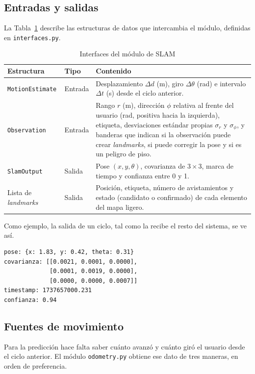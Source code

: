\subsection{Entradas y salidas}

La Tabla~\ref{tab:slam_interfaces} describe las estructuras de datos que intercambia el
módulo, definidas en \texttt{interfaces.py}.

\begin{table}[H]
\centering
\caption{Interfaces del módulo de SLAM}
\label{tab:slam_interfaces}
\renewcommand{\arraystretch}{1.25}
\begin{tabular}{|p{3.3cm}|p{1.6cm}|p{9.6cm}|}
\hline
\textbf{Estructura} & \textbf{Tipo} & \textbf{Contenido} \\
\hline
\texttt{MotionEstimate} & Entrada & Desplazamiento $\Delta d$ (m), giro $\Delta\theta$
(rad) e intervalo $\Delta t$ (s) desde el ciclo anterior. \\
\hline
\texttt{Observation} & Entrada & Rango $r$ (m), dirección $\phi$ relativa al frente
del usuario (rad, positiva hacia la izquierda), etiqueta, desviaciones estándar propias
$\sigma_r$ y $\sigma_\phi$, y banderas que indican si la observación puede crear
\emph{landmarks}, si puede corregir la pose y si es un peligro de piso. \\
\hline
\texttt{SlamOutput} & Salida & Pose $(x, y, \theta)$, covarianza de $3 \times 3$,
marca de tiempo y confianza entre 0 y 1. \\
\hline
Lista de \emph{landmarks} & Salida & Posición, etiqueta, número de avistamientos y
estado (candidato o confirmado) de cada elemento del mapa ligero. \\
\hline
\end{tabular}
\end{table}

Como ejemplo, la salida de un ciclo, tal como la recibe el resto del sistema, se ve así.

\begin{verbatim}
pose: {x: 1.83, y: 0.42, theta: 0.31}
covarianza: [[0.0021, 0.0001, 0.0000],
             [0.0001, 0.0019, 0.0000],
             [0.0000, 0.0000, 0.0007]]
timestamp: 1737657000.231
confianza: 0.94
\end{verbatim}

\subsection{Fuentes de movimiento}

Para la predicción hace falta saber cuánto avanzó y cuánto giró el usuario desde el
ciclo anterior. El módulo \texttt{odometry.py} obtiene ese dato de tres maneras, en
orden de preferencia.

